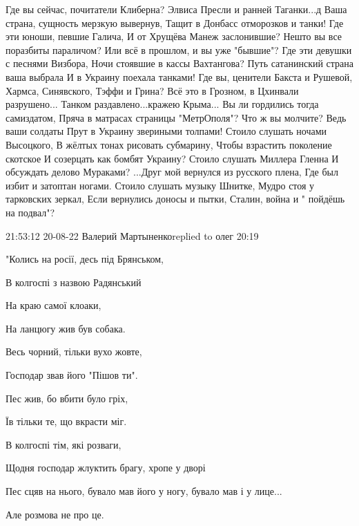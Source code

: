  
 
 
 
 



Где вы сейчас, почитатели Клиберна?
Элвиса Пресли и ранней Таганки...д
Ваша страна, сущность мерзкую вывернув,
Тащит в Донбасс отморозков и танки!
Где эти юноши, певшие Галича,
И от Хрущёва Манеж заслонившие?
Нешто вы все поразбиты параличом?
Или всё в прошлом, и вы уже "бывшие"?
Где эти девушки с песнями Визбора,
Ночи стоявшие в кассы Вахтангова?
Путь сатанинский страна ваша выбрала
И в Украину поехала танками!
Где вы, ценители Бакста и Рушевой,
Хармса, Синявского, Тэффи и Грина?
Всё это в Грозном, в Цхинвали разрушено...
Танком раздавлено...кражею Крыма...
Вы ли гордились тогда самиздатом,
Пряча в матрасах страницы "МетрОполя"?
Что ж вы молчите? Ведь ваши солдаты
Прут в Украину звериными толпами!
Стоило слушать ночами Высоцкого,
В жёлтых тонах рисовать субмарину,
Чтобы взрастить поколение скотское
И созерцать как бомбят Украину?
Стоило слушать Миллера Гленна
И обсуждать делово Мураками?
...Друг мой вернулся из русского плена,
Где был избит и затоптан ногами.
Стоило слушать музыку Шнитке,
Мудро стоя у тарковских зеркал,
Если вернулись доносы и пытки,
Сталин, война и " пойдёшь на подвал"?


21:53:12 20-08-22
Валерий Мартыненкоreplied to олег
20:19

"Колись на росії, десь під Брянськом,

В колгоспі з назвою Радянський

На краю самої клоаки,

На ланцюгу жив був собака.

Весь чорний, тільки вухо жовте,

Господар звав його "Пішов ти".

Пес жив, бо вбити було гріх,

Їв тільки те, що вкрасти міг.

В колгоспі тім, які розваги,

Щодня господар жлуктить брагу, хропе у дворі

Пес сцяв на нього, бувало мав його у ногу, бувало мав і у лице...

Але розмова не про це.


